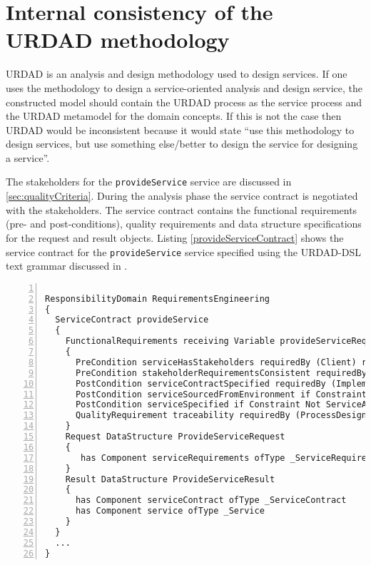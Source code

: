 \section{Internal consistency of the URDAD methodology}
\label{sec:urdadConsistency}

URDAD is an analysis and design methodology used to design services. If one uses the methodology to design a service-oriented analysis and design service, the constructed model should contain the URDAD process as the service process and the URDAD metamodel for the domain concepts. If this is not the case then URDAD would be inconsistent because it would state ``use this methodology to design services, but use something else/better to design the service for designing a service''. 

The stakeholders for the \verb+provideService+ service are discussed in \ref{sec:qualityCriteria}. During the analysis phase the service contract is negotiated with the stakeholders. The service contract contains the functional requirements (pre- and post-conditions), quality requirements and data structure specifications for the request and result objects. Listing \ref{provideServiceContract} shows the service contract for the \verb+provideService+ service specified using the URDAD-DSL text grammar discussed in \cite{solms_domain-specific_????}. 

\lstset{language=urdad,caption=Specifying a state constraint in the URDAD text grammar.,label=provideServiceContract}
\begin{lstlisting}[numbers=left,escapechar=|]

ResponsibilityDomain RequirementsEngineering
{
  ServiceContract provideService
  {
    FunctionalRequirements receiving Variable provideServiceRequest ofType ProvideServiceRequest yielding Variable provideServiceResult ofType ProvideServiceResult
    {
      PreCondition serviceHasStakeholders requiredBy (Client) raises NoStakeholdersException checks Constraint ServiceHasStakeholders
      PreCondition stakeholderRequirementsConsistent requiredBy (Client Implementation Testing) raises InconsistentStakeholderRequirementsException checks Constraint RequirementsConsistent
      PostCondition serviceContractSpecified requiredBy (Implementation Testing) ensures Constraint ServiceContractSpecified
      PostCondition serviceSourcedFromEnvironment if Constraint ServiceAvailable requiredBy (Client) ensures Constraint ServiceSourced with Query OCL:"serviceContract"
      PostCondition serviceSpecified if Constraint Not ServiceAvailable requiredBy(Client Implementation) ensures ServiceSpecified
      QualityRequirement traceability requiredBy (ProcessDesign ProjectManagement Development)  
    }
    Request DataStructure ProvideServiceRequest
    {
       has Component serviceRequirements ofType _ServiceRequirements
    }
    Result DataStructure ProvideServiceResult
    {
      has Component serviceContract ofType _ServiceContract
      has Component service ofType _Service
    }        
  }
  ...
} 
\end{lstlisting}

